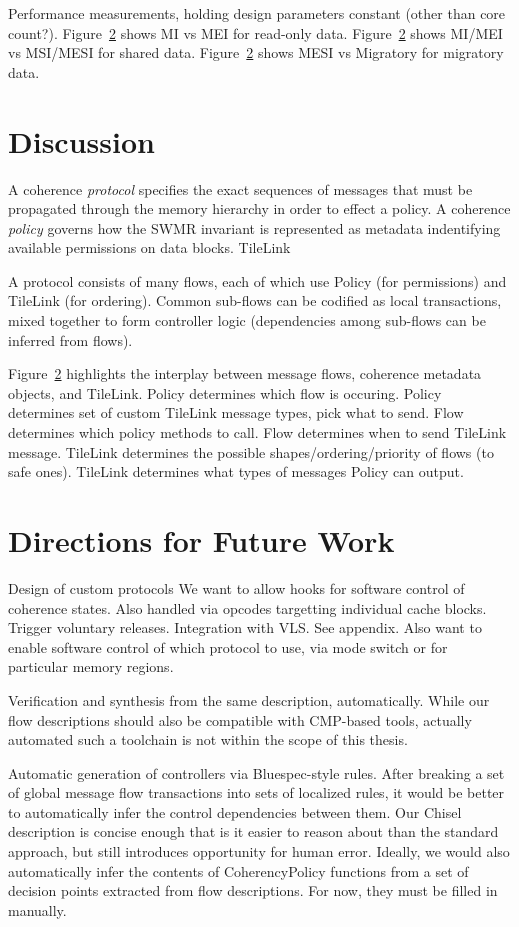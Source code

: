 Performance measurements, holding design parameters constant (other than core count?).
Figure~\ref{} shows MI vs MEI for read-only data.
Figure~\ref{} shows MI/MEI vs MSI/MESI for shared data.
Figure~\ref{} shows MESI vs Migratory for migratory data.

\section{Discussion}

A coherence {\em protocol} specifies the exact sequences of messages that must be propagated through the memory hierarchy in order to effect a policy.
A coherence {\em policy} governs how the SWMR invariant is represented as metadata indentifying available permissions on data blocks.
TileLink

A protocol consists of many flows, each of which use Policy (for permissions) and TileLink (for ordering).
Common sub-flows can be codified as local transactions, mixed together to form controller logic 
(dependencies among sub-flows can be inferred from flows).

Figure~\ref{} highlights the interplay between message flows, coherence metadata objects, and TileLink.
Policy determines which flow is occuring.
Policy determines set of custom TileLink message types, pick what to send.
Flow determines which policy methods to call.
Flow determines when to send TileLink message.
TileLink determines the possible shapes/ordering/priority of flows (to safe ones).
TileLink determines what types of messages Policy can output.

\section{Directions for Future Work}

Design of custom protocols
We want to allow hooks for software control of coherence states.
Also handled via opcodes targetting individual cache blocks.
Trigger voluntary releases.
Integration with VLS.
See appendix.
Also want to enable software control of which protocol to use, via mode switch or for particular memory regions.

Verification and synthesis from the same description, automatically.
While our flow descriptions should also be compatible with CMP-based tools,
actually automated such a toolchain is not within the scope of this thesis.

Automatic generation of controllers via Bluespec-style rules.
After breaking a set of global message flow transactions into sets of localized rules,
it would be better to automatically infer the control dependencies between them.
Our Chisel description is concise enough that is it easier to reason about than the standard approach,
but still introduces opportunity for human error.
Ideally, we would also automatically infer the contents of CoherencyPolicy functions from a set of decision points extracted from flow descriptions.
For now, they must be filled in manually.

